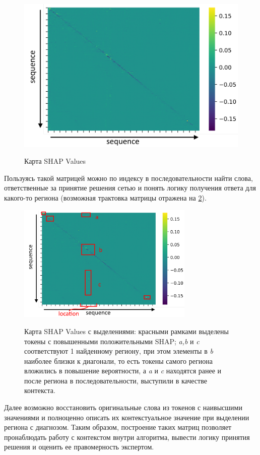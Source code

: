 \begin{figure}[h]
\caption{Карта SHAP Values}
\centering
\includegraphics[width=1\textwidth]{sequence_shap_map.png}
\label{shap_mt}
\end{figure}
Пользуясь такой матрицей можно по индексу в последовательности найти слова, ответственные за принятие решения сетью и понять логику получения ответа для какого-то региона (возможная трактовка матрицы отражена на \ref{shap_mt_alloc}).
\begin{figure}[h]
\caption{Карта SHAP Values с выделениями: красными рамками выделены токены с повышенными положительными SHAP; \textit{a,b} и \textit{c} соответствуют 1 найденному региону, при этом элементы в \textit{b} наиболее близки к диагонали, то есть токены самого региона вложились в повышение вероятности, а \textit{a} и \textit{c} находятся ранее и после региона в последовательности, выступили в качестве контекста.}
\centering
\includegraphics[width=0.75\textwidth]{sequence_shap_map_loc_annot.png}
\label{shap_mt_alloc}
\end{figure}
\newline
Далее возможно восстановить оригинальные слова из токенов с наивысшими значениями и полноценно описать их контекстуальное значение при выделении региона с диагнозом.
\newline
Таким образом, построение таких матриц позволяет пронаблюдать работу с контекстом внутри алгоритма, вывести логику принятия решения и оценить ее правомерность экспертом.